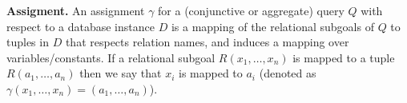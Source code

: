 
\begin{definition}{\bf Assigment. }\cite{amsterdamer2012provenance}
An assignment $\gamma$ for a (conjunctive or aggregate) query $Q$ with respect to a database instance $D$ is a mapping of the relational subgoals of $Q$ to tuples in $D$ that respects relation names, and induces a mapping over variables/constants.  If a relational subgoal $R(x_1,\dots, x_n)$ is mapped to a tuple $R(a_1, \dots, a_n)$ then we say that $x_i$ is mapped to $a_i$ (denoted as $\gamma(x_1,\dots, x_n) = (a_1, \dots, a_n)$).



\end{definition}


